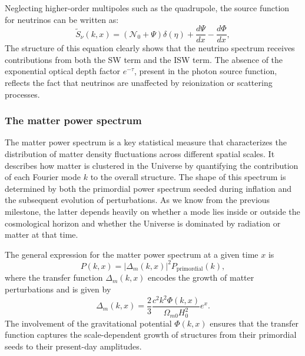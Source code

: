 \documentclass{aa}
\numberwithin{equation}{section}
\numberwithin{table}{section}
\numberwithin{figure}{section}
\begin{document}
Neglecting higher-order multipoles such as the quadrupole, the source function for neutrinos can be written as:
\begin{equation}
\tilde{S}_\nu(k,x) = (\mathcal{N}_0 + \Psi)\delta(\eta) + \frac{d\Psi}{dx} - \frac{d\Phi}{dx},
\end{equation}
The structure of this equation clearly shows that the neutrino spectrum receives contributions from both the SW term and the ISW term. The absence of the exponential optical depth factor $e^{-\tau}$, present in the photon source function, reflects the fact that neutrinos are unaffected by reionization or scattering processes. 





\subsubsection{The matter power spectrum}\label{subsubsec: IV theory matter}
The matter power spectrum is a key statistical measure that characterizes the distribution of matter density fluctuations across different spatial scales. It describes how matter is clustered in the Universe by quantifying the contribution of each Fourier mode $k$ to the overall structure. The shape of this spectrum is determined by both the primordial power spectrum seeded during inflation and the subsequent evolution of perturbations. As we know from the previous milestone, the latter depends heavily on whether a mode lies inside or outside the cosmological horizon and whether the Universe is dominated by radiation or matter at that time.

The general expression for the matter power spectrum at a given time $x$ is
\begin{equation}
  P(k, x) = |\Delta_m(k, x)|^2 P_\text{primordial}(k),
\end{equation}
where the transfer function $\Delta_m(k, x)$ encodes the growth of matter perturbations and is given by
\begin{equation}
  \Delta_m(k, x) = \frac{2}{3}\frac{c^2 k^2 \Phi(k,x)}{\Omega_{m0}H_0^2}e^x.
\end{equation}
The involvement of the gravitational potential $\Phi(k,x)$ ensures that the transfer function captures the scale-dependent growth of structures from their primordial seeds to their present-day amplitudes.
\end{document}
